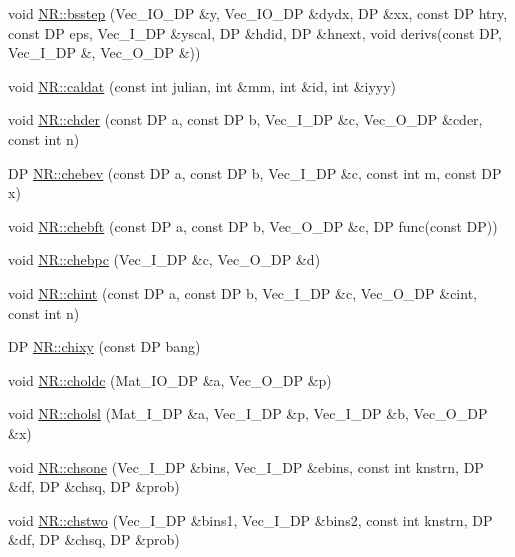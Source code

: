 \begin{DoxyCompactItemize}
\item 
void \mbox{\hyperlink{namespaceNR_a2fc62044e08a4a33016b21cba60408be}{N\+R\+::bsstep}} (Vec\+\_\+\+I\+O\+\_\+\+DP \&y, Vec\+\_\+\+I\+O\+\_\+\+DP \&dydx, DP \&xx, const DP htry, const DP eps, Vec\+\_\+\+I\+\_\+\+DP \&yscal, DP \&hdid, DP \&hnext, void derivs(const DP, Vec\+\_\+\+I\+\_\+\+DP \&, Vec\+\_\+\+O\+\_\+\+DP \&))
\item 
void \mbox{\hyperlink{namespaceNR_ad0042558c0003dd2b235a92f031d84f8}{N\+R\+::caldat}} (const int julian, int \&mm, int \&id, int \&iyyy)
\item 
void \mbox{\hyperlink{namespaceNR_a139dd9db85bba8d70c67d174413b5837}{N\+R\+::chder}} (const DP a, const DP b, Vec\+\_\+\+I\+\_\+\+DP \&c, Vec\+\_\+\+O\+\_\+\+DP \&cder, const int n)
\item 
DP \mbox{\hyperlink{namespaceNR_a824086662aa6006a7bf1d3954ae84e43}{N\+R\+::chebev}} (const DP a, const DP b, Vec\+\_\+\+I\+\_\+\+DP \&c, const int m, const DP x)
\item 
void \mbox{\hyperlink{namespaceNR_a66f115e76c9feef59cfc3ef4a534acc5}{N\+R\+::chebft}} (const DP a, const DP b, Vec\+\_\+\+O\+\_\+\+DP \&c, DP func(const DP))
\item 
void \mbox{\hyperlink{namespaceNR_a76a061d807150f37b176e040ce5c93c4}{N\+R\+::chebpc}} (Vec\+\_\+\+I\+\_\+\+DP \&c, Vec\+\_\+\+O\+\_\+\+DP \&d)
\item 
void \mbox{\hyperlink{namespaceNR_a5d3b77d2ac43628be77688f9cf398473}{N\+R\+::chint}} (const DP a, const DP b, Vec\+\_\+\+I\+\_\+\+DP \&c, Vec\+\_\+\+O\+\_\+\+DP \&cint, const int n)
\item 
DP \mbox{\hyperlink{namespaceNR_a78d98f7ea50330e48e2439f1476f1a11}{N\+R\+::chixy}} (const DP bang)
\item 
void \mbox{\hyperlink{namespaceNR_ade5b24841dfda9180b307c75b572c2e5}{N\+R\+::choldc}} (Mat\+\_\+\+I\+O\+\_\+\+DP \&a, Vec\+\_\+\+O\+\_\+\+DP \&p)
\item 
void \mbox{\hyperlink{namespaceNR_aac72daccbf4c98d768d3aaae022c3f88}{N\+R\+::cholsl}} (Mat\+\_\+\+I\+\_\+\+DP \&a, Vec\+\_\+\+I\+\_\+\+DP \&p, Vec\+\_\+\+I\+\_\+\+DP \&b, Vec\+\_\+\+O\+\_\+\+DP \&x)
\item 
void \mbox{\hyperlink{namespaceNR_a79990074123af59275160b7887c3fc51}{N\+R\+::chsone}} (Vec\+\_\+\+I\+\_\+\+DP \&bins, Vec\+\_\+\+I\+\_\+\+DP \&ebins, const int knstrn, DP \&df, DP \&chsq, DP \&prob)
\item 
void \mbox{\hyperlink{namespaceNR_ae212f167f2b1e98deda943eb3aacd84b}{N\+R\+::chstwo}} (Vec\+\_\+\+I\+\_\+\+DP \&bins1, Vec\+\_\+\+I\+\_\+\+DP \&bins2, const int knstrn, DP \&df, DP \&chsq, DP \&prob)

\end{DoxyCompactItemize}
